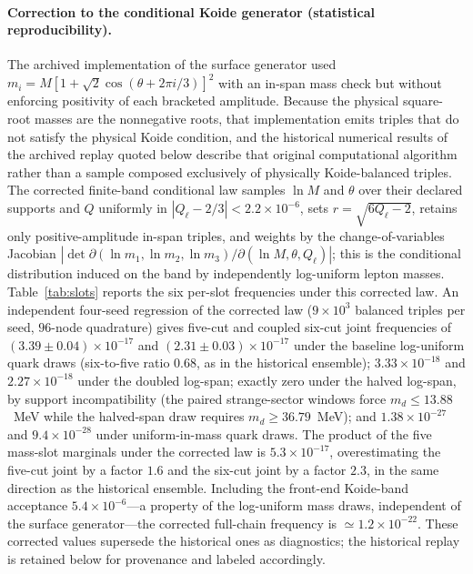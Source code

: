 \documentclass[aps,twocolumn,superscriptaddress,nofootinbib,floatfix]{revtex4-2}
\begin{document}
\paragraph{Correction to the conditional Koide generator (statistical reproducibility).}
The archived implementation of the surface generator used $m_i=M[1+\sqrt2\cos(\theta+2\pi i/3)]^2$ with an in-span mass check but without enforcing positivity of each bracketed amplitude. Because the physical square-root masses are the nonnegative roots, that implementation emits triples that do not satisfy the physical Koide condition, and the historical numerical results of the archived replay quoted below describe that original computational algorithm rather than a sample composed exclusively of physically Koide-balanced triples. The corrected finite-band conditional law samples $\ln M$ and $\theta$ over their declared supports and $Q$ uniformly in $|Q_\ell-2/3|<2.2\times10^{-6}$, sets $r=\sqrt{6Q_\ell-2}$, retains only positive-amplitude in-span triples, and weights by the change-of-variables Jacobian $|\det\partial(\ln m_1,\ln m_2,\ln m_3)/\partial(\ln M,\theta,Q_\ell)|$; this is the conditional distribution induced on the band by independently log-uniform lepton masses. Table~\ref{tab:slots} reports the six per-slot frequencies under this corrected law. An independent four-seed regression of the corrected law ($9\times10^3$ balanced triples per seed, $96$-node quadrature) gives five-cut and coupled six-cut joint frequencies of $(3.39\pm0.04)\times10^{-17}$ and $(2.31\pm0.03)\times10^{-17}$ under the baseline log-uniform quark draws (six-to-five ratio $0.68$, as in the historical ensemble); $3.33\times10^{-18}$ and $2.27\times10^{-18}$ under the doubled log-span; exactly zero under the halved log-span, by support incompatibility (the paired strange-sector windows force $m_d\le13.88$~MeV while the halved-span draw requires $m_d\ge36.79$~MeV); and $1.38\times10^{-27}$ and $9.4\times10^{-28}$ under uniform-in-mass quark draws. The product of the five mass-slot marginals under the corrected law is $5.3\times10^{-17}$, overestimating the five-cut joint by a factor $1.6$ and the six-cut joint by a factor $2.3$, in the same direction as the historical ensemble. Including the front-end Koide-band acceptance $5.4\times10^{-6}$---a property of the log-uniform mass draws, independent of the surface generator---the corrected full-chain frequency is $\simeq1.2\times10^{-22}$. These corrected values supersede the historical ones as diagnostics; the historical replay is retained below for provenance and labeled accordingly.
\end{document}
